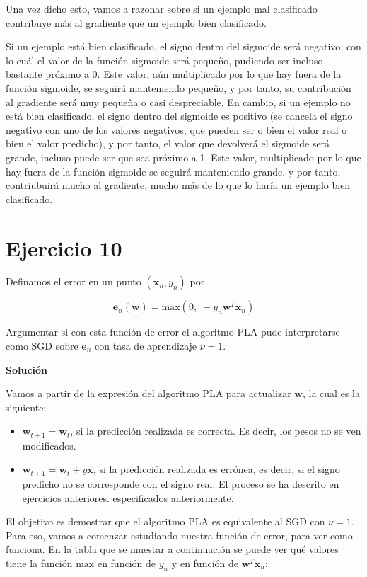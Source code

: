 \documentclass[11pt,a4paper]{article}
\newcommand{\answer}{\noindent\textbf{Solución}}
\newcommand{\maximum}{\text{max}}
\begin{document}
Una vez dicho esto, vamos a razonar sobre si un ejemplo mal clasificado contribuye más al gradiente que un ejemplo bien
clasificado.

Si un ejemplo está bien clasificado, el signo dentro del sigmoide será negativo, con lo cuál el valor de la función sigmoide
será pequeño, pudiendo ser incluso bastante próximo a 0. Este valor, aún multiplicado por lo que hay fuera de la función
sigmoide, se seguirá manteniendo pequeño, y por tanto, su contribución al gradiente será muy pequeña o casi despreciable.
En cambio, si un ejemplo no está bien clasificado, el signo dentro del sigmoide es positivo (se cancela el signo
negativo con uno de los valores negativos, que pueden ser o bien el valor real o bien el valor predicho), y por tanto, el
valor que devolverá el sigmoide será grande, incluso puede ser que sea próximo a 1. Este valor, multiplicado por lo que hay
fuera de la función sigmoide se seguirá manteniendo grande, y por tanto, contriubuirá mucho al gradiente, mucho más de lo
que lo haría un ejemplo bien clasificado.

\section*{Ejercicio 10}

\noindent Definamos el error en un punto $(\mathbf{x}_n, y_n)$ por

\[\mathbf{e}_n(\mathbf{w}) = \maximum(0, \; -y_n\mathbf{w}^T\mathbf{x}_n)\] 

\noindent Argumentar si con esta función de error el algoritmo PLA pude interpretarse como SGD sobre $\mathbf{e}_n$ con tasa
de aprendizaje $\nu = 1$.

\answer

Vamos a partir de la expresión del algoritmo PLA para actualizar $\mathbf{w}$, la cual es la siguiente:

\begin{itemize}
	\item $\mathbf{w}_{t+1} = \mathbf{w}_{t}$, si la predicción realizada es correcta. Es decir, los pesos no se ven
	modificados.
	\item $\mathbf{w}_{t+1} = \mathbf{w}_{t} + y\mathbf{x}$, si la predicción realizada es errónea, es decir, si el signo
	predicho no se corresponde con el signo real. El proceso se ha descrito en ejercicios anteriores.
	especificados anteriormente.
\end{itemize}

El objetivo es demostrar que el algoritmo PLA es equivalente al SGD con $\nu = 1$. Para eso, vamos a comenzar estudiando
nuestra función de error, para ver como funciona. En la tabla que se muestar a continuación se puede ver qué valores
tiene la función $\maximum$ en función de $y_n$ y en función de $\mathbf{w}^T\mathbf{x}_n$:
\end{document}
